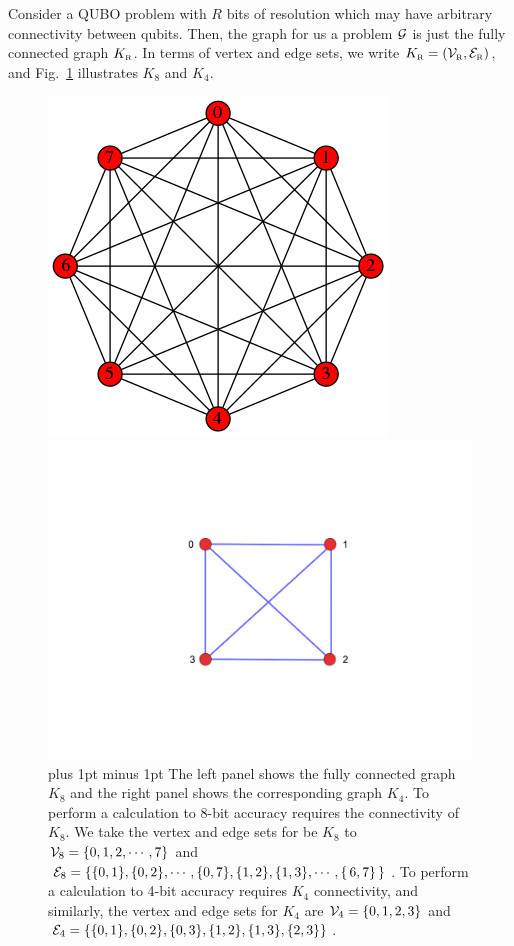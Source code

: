 \documentclass[preprint,12pt,eqsecnum,nofootinbib,amsmath,amssymb]{revtex4}
\newcommand{\smR}{{\rm\scriptscriptstyle R}}
\newcommand{\footnoteskip}{\baselineskip 12pt plus 1pt minus 1pt}
\begin{document}
Consider a QUBO problem with $R$ bits of resolution which may have arbitrary
connectivity between qubits.  Then, the graph for us a problem ${\cal G}$ is 
just the fully connected graph $K_\smR$.  In terms of vertex and edge sets,
we write  $K_\smR = ({\cal V}_\smR, {\cal E}_\smR)$, and Fig.~\ref{fig_K8_K4} 
illustrates $K_8$ and $K_4$. 
%
\begin{figure}[t!]
\begin{minipage}[c]{0.45\linewidth}
\includegraphics[scale=0.35]{figs/K8_1.png} 
\end{minipage}
\hfill
\begin{minipage}[c]{0.5\linewidth}
\includegraphics[scale=0.40]{figs/K4.png} 
\end{minipage}
\vskip-1.0cm
\caption{\footnoteskip
  The left panel shows the fully connected graph $K_8$ and the right panel 
  shows the corresponding graph $K_4$. To perform a calculation to 8-bit
  accuracy requires the connectivity of $K_8$.  We take the vertex and edge 
  sets for be $K_8$ to ${\cal V}_8 = \{0, 1, 2, \cdots, 7 \}$ and ${\cal E}_8 = 
  \{ \{ 0, 1 \}, \{ 0, 2 \},  \cdots , \{ 0 , 7\} ,  \{ 1, 2 \} ,\{ 1, 3\} , \cdots,  
  \{\, 6 , 7\}\, \}$. To perform a calculation to 4-bit accuracy requires $K_4$ 
  connectivity,  and similarly, the vertex and edge sets for $K_4$ are 
  ${\cal V}_4 = \{0, 1, 2, 3 \}$ and ${\cal E}_4 = \{    \{ 0, 1\}, \{ 0, 2\}, 
  \{ 0, 3\}, \{ 1, 2\}, \{ 1, 3\}, \{ 2, 3\}    \} $.
}
\label{fig_K8_K4}
\end{figure}
\end{document}
